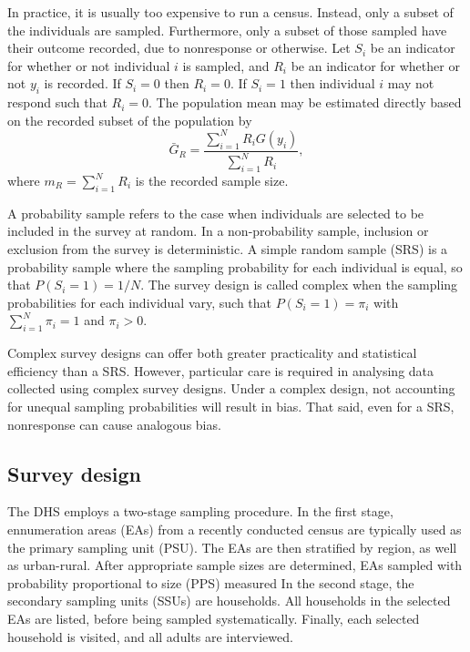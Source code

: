 \documentclass[a4paper, nobind]{templates/ociamthesis}
\begin{document}
In practice, it is usually too expensive to run a census.
Instead, only a subset of the individuals are sampled.
Furthermore, only a subset of those sampled have their outcome recorded, due to nonresponse or otherwise.
Let \(S_i\) be an indicator for whether or not individual \(i\) is sampled, and \(R_i\) be an indicator for whether or not \(y_i\) is recorded.
If \(S_i = 0\) then \(R_i = 0\).
If \(S_i = 1\) then individual \(i\) may not respond such that \(R_i = 0\).
The population mean may be estimated directly based on the recorded subset of the population by
\begin{equation}
\bar G_R = \frac{\sum_{i = 1}^N R_i G(y_i)}{\sum_{i = 1}^N R_i}, \label{eq:direct}
\end{equation}
where \(m_R = \sum_{i = 1}^N R_i\) is the recorded sample size.

A probability sample refers to the case when individuals are selected to be included in the survey at random.
In a non-probability sample, inclusion or exclusion from the survey is deterministic.
A simple random sample (SRS) is a probability sample where the sampling probability for each individual is equal, so that \(P(S_i = 1) = 1 / N\).
The survey design is called complex when the sampling probabilities for each individual vary, such that \(P(S_i = 1) = \pi_i\) with \(\sum_{i = 1}^N \pi_i = 1\) and \(\pi_i > 0\).

Complex survey designs can offer both greater practicality and statistical efficiency than a SRS.
However, particular care is required in analysing data collected using complex survey designs.
Under a complex design, not accounting for unequal sampling probabilities will result in bias.
That said, even for a SRS, nonresponse can cause analogous bias.

\hypertarget{survey-design}{%
\subsection{Survey design}\label{survey-design}}

The DHS \autocite{measure2012sampling} employs a two-stage sampling procedure.
In the first stage, ennumeration areas (EAs) from a recently conducted census are typically used as the primary sampling unit (PSU).
The EAs are then stratified by region, as well as urban-rural.
After appropriate sample sizes are determined, EAs sampled with probability proportional to size (PPS) measured
In the second stage, the secondary sampling units (SSUs) are households.
All households in the selected EAs are listed, before being sampled systematically.
Finally, each selected household is visited, and all adults are interviewed.
\end{document}
